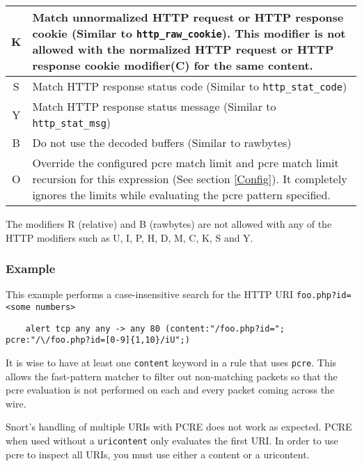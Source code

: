 \documentclass[english]{report}
\newenvironment{note}{
\samepage
    \vspace{10pt}{\textsf{
        {\hspace{7pt}\Huge{$\triangle$\hspace{-12.5pt}{\Large{$^!$}}}}\hspace{5pt}
        {\Large{NOTE}}
    }
    }
   \begin{center}
    \par\vspace{-17pt}

    \begin{lrbox}{\savepar}
    \begin{minipage}[r]{6in}
}
{
    \end{minipage}
    \end{lrbox}
    \fbox{
        \usebox{
            \savepar
	}
    }
    \par\vskip10pt
    \end{center}
}
\newenvironment{note}{
        \begin{rawhtml}
        <p><table border="1"><tr><td><b>
        Note:&nbsp;&nbsp;</b>
        \end{rawhtml}
}{
        \begin{rawhtml}
        </b></td></tr></table></p>
        \end{rawhtml}
}
\begin{document}
\begin{table}[ht]
\begin{center}
\begin{tabular}{|c|p{4.5in}|}
\hline
K &
Match unnormalized HTTP request or HTTP response cookie (Similar to \texttt{http\_raw\_cookie}). 
This modifier is not allowed with the normalized HTTP request or HTTP response cookie 
modifier(C) for the same content. \\

\hline
S &
Match HTTP response status code (Similar to \texttt{http\_stat\_code}) \\

\hline
Y &
Match HTTP response status message (Similar to \texttt{http\_stat\_msg}) \\

\hline
B &
Do not use the decoded buffers (Similar to rawbytes) \\

\hline
O &
Override the configured pcre match limit and pcre match limit recursion for 
this expression (See section \ref{Config}). It completely ignores the limits 
while evaluating the pcre pattern specified. \\

\hline
\end{tabular}
\end{center}
\end{table}

\begin{note}
The modifiers R (relative) and B (rawbytes) are not allowed with any of the HTTP modifiers such as U, I, 
P, H, D, M, C, K, S and Y. 
\end{note}

\subsubsection{Example}

This example performs a case-insensitive search for the HTTP URI \texttt{foo.php?id=<some numbers>}

\begin{verbatim}
    alert tcp any any -> any 80 (content:"/foo.php?id="; pcre:"/\/foo.php?id=[0-9]{1,10}/iU";)
\end{verbatim}

\begin{note}
It is wise to have at least one \texttt{content} keyword in a rule that uses \texttt{pcre}.  This
allows the fast-pattern matcher to filter out non-matching packets so that the pcre evaluation is
not performed on each and every packet coming across the wire.
\end{note}

\begin{note}

Snort's handling of multiple URIs with PCRE does not work as expected.  PCRE
when used without a \texttt{uricontent} only evaluates the first URI.  In order
to use pcre to inspect all URIs, you must use either a content or a uricontent.

\end{note}
\end{document}
